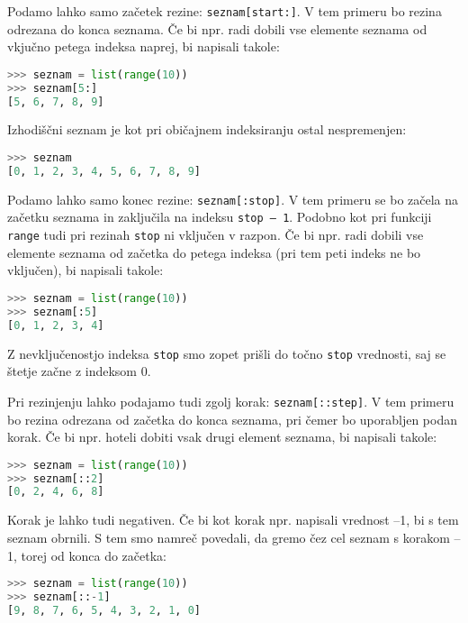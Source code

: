 Podamo lahko samo začetek rezine: \texttt{seznam[start:]}.  V tem primeru bo rezina odrezana do konca seznama. Če bi npr. radi dobili vse elemente seznama od vkjučno petega indeksa naprej, bi napisali takole:
\begin{lstlisting}[language=Python, showstringspaces=false]
>>> seznam = list(range(10))
>>> seznam[5:]
[5, 6, 7, 8, 9]
\end{lstlisting}
Izhodiščni seznam je kot pri običajnem indeksiranju ostal nespremenjen:
\begin{lstlisting}[language=Python, showstringspaces=false]
>>> seznam
[0, 1, 2, 3, 4, 5, 6, 7, 8, 9]
\end{lstlisting}

Podamo lahko samo konec rezine: \texttt{seznam[:stop]}.  V tem primeru se bo začela na začetku seznama in zaključila na indeksu \texttt{stop -- 1}. Podobno kot pri funkciji \texttt{range} tudi pri rezinah \texttt{stop} ni vključen v razpon. Če bi npr. radi dobili vse elemente seznama od začetka do petega indeksa (pri tem peti indeks ne bo vključen), bi napisali takole:
\begin{lstlisting}[language=Python, showstringspaces=false]
>>> seznam = list(range(10))
>>> seznam[:5]
[0, 1, 2, 3, 4]
\end{lstlisting}
Z nevključenostjo indeksa \texttt{stop} smo zopet prišli do točno \texttt{stop} vrednosti, saj se štetje začne z indeksom 0. 

Pri rezinjenju lahko podajamo tudi zgolj korak: \texttt{seznam[::step]}. V tem primeru bo rezina odrezana od začetka do konca seznama, pri čemer bo uporabljen podan korak. Če bi npr. hoteli dobiti vsak drugi element seznama, bi napisali takole:
\begin{lstlisting}[language=Python, showstringspaces=false]
>>> seznam = list(range(10))
>>> seznam[::2]
[0, 2, 4, 6, 8]
\end{lstlisting}
Korak je lahko tudi negativen. Če bi kot korak npr. napisali vrednost --1, bi s tem seznam obrnili. S tem smo namreč povedali, da gremo čez cel seznam s korakom --1, torej od konca do začetka:
\begin{lstlisting}[language=Python, showstringspaces=false]
>>> seznam = list(range(10))
>>> seznam[::-1]
[9, 8, 7, 6, 5, 4, 3, 2, 1, 0]
\end{lstlisting}

